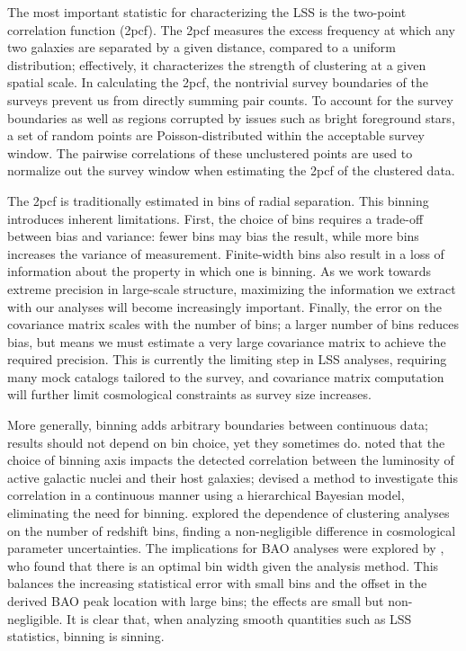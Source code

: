 \documentclass[modern]{aastex62}
\newcommand{\cf}{2pcf\xspace} %
\begin{document}
The most important statistic for characterizing the LSS is the two-point correlation function (\cf).
The \cf measures the excess frequency at which any two galaxies are separated by a given distance, compared to a uniform distribution; effectively, it characterizes the strength of clustering at a given spatial scale. 
In calculating the \cf, the nontrivial survey boundaries of the surveys prevent us from directly summing pair counts.
To account for the survey boundaries as well as regions corrupted by issues such as bright foreground stars, a set of random points are Poisson-distributed within the acceptable survey window. 
The pairwise correlations of these unclustered points are used to normalize out the survey window when estimating the \cf of the clustered data.

The \cf is traditionally estimated in bins of radial separation.
This binning introduces inherent limitations.
First, the choice of bins requires a trade-off between bias and variance: fewer bins may bias the result, while more bins increases the variance of measurement.
Finite-width bins also result in a loss of information about the property in which one is binning.
As we work towards extreme precision in large-scale structure, maximizing the information we extract with our analyses will become increasingly important.
Finally, the error on the covariance matrix scales with the number of bins; a larger number of bins reduces bias, but means we must estimate a very large covariance matrix to achieve the required precision.
This is currently the limiting step in LSS analyses, requiring many mock catalogs tailored to the survey, and covariance matrix computation will further limit cosmological constraints as survey size increases.

More generally, binning adds arbitrary boundaries between continuous data; results should not depend on bin choice, yet they sometimes do.
\cite{Lanzuisi2017} noted that the choice of binning axis impacts the detected correlation between the luminosity of active galactic nuclei and their host galaxies; \cite{Grimmett2020} devised a method to investigate this correlation in a continuous manner using a hierarchical Bayesian model, eliminating the need for binning.
\cite{Bailoni2016} explored the dependence of clustering analyses on the number of redshift bins, finding a non-negligible difference in cosmological parameter uncertainties.
The implications for BAO analyses were explored by \cite{Percival2014}, who found that there is an optimal bin width given the analysis method.
This balances the increasing statistical error with small bins and the offset in the derived BAO peak location with large bins; the effects are small but non-negligible.
It is clear that, when analyzing smooth quantities such as LSS statistics, binning is sinning.
\end{document}
